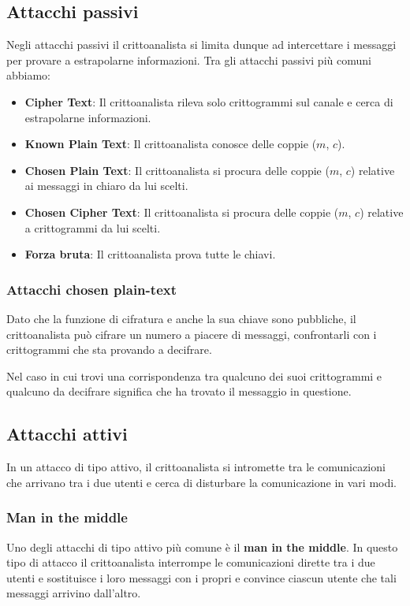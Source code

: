 \subsection{Attacchi passivi}
Negli attacchi passivi il crittoanalista si limita dunque ad intercettare i messaggi per provare a estrapolarne
informazioni. Tra gli attacchi passivi pi\`u comuni abbiamo:
\begin{itemize}
	\item \textbf{Cipher Text}: Il crittoanalista rileva solo crittogrammi sul canale e cerca di estrapolarne informazioni.
	\item \textbf{Known Plain Text}: Il crittoanalista conosce delle coppie ($m$, $c$).
	\item \textbf{Chosen Plain Text}: Il crittoanalista si procura delle coppie ($m$, $c$) relative
	      ai messaggi in chiaro da lui scelti.
	\item \textbf{Chosen Cipher Text}: Il crittoanalista si procura delle coppie ($m$, $c$) relative a crittogrammi
	      da lui scelti.
	\item \textbf{Forza bruta}: Il crittoanalista prova tutte le chiavi.
\end{itemize}

\subsubsection{Attacchi chosen plain-text}
Dato che la funzione di cifratura e anche la sua chiave sono pubbliche, il crittoanalista pu\`o cifrare un numero a
piacere di messaggi, confrontarli con i crittogrammi che sta provando a decifrare.

Nel caso in cui trovi una corrispondenza tra qualcuno dei suoi crittogrammi e qualcuno da decifrare significa che ha
trovato il messaggio in questione.

\subsection{Attacchi attivi}
In un attacco di tipo attivo, il crittoanalista si intromette tra le comunicazioni che arrivano tra i due utenti e
cerca di disturbare la comunicazione in vari modi.

\subsubsection{Man in the middle}
Uno degli attacchi di tipo attivo pi\`u comune \`e il \textbf{man in the middle}. In questo tipo di attacco il
crittoanalista interrompe le comunicazioni dirette tra i due utenti e sostituisce i loro messaggi con i propri e convince
ciascun utente che tali messaggi arrivino dall'altro.